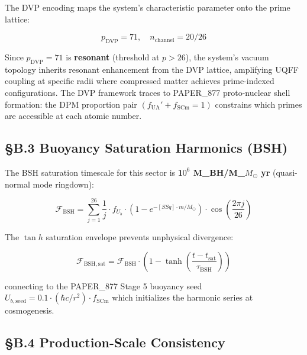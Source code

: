 \documentclass[12pt,a4paper]{article}
\begin{document}
The DVP encoding maps the system's characteristic parameter onto the prime lattice:

\begin{equation}
p_{\mathrm{DVP}} = 71, \quad n_{\mathrm{channel}} = 20/26
\end{equation}

Since $p_{\mathrm{DVP}} = 71$ is \textbf{resonant} (threshold at $p > 26$), the system's vacuum topology inherits resonant enhancement from the DVP lattice, amplifying UQFF coupling at specific radii where compressed matter achieves prime-indexed configurations. The DVP framework traces to PAPER\_877 proto-nuclear shell formation: the DPM proportion pair $(f_{\mathrm{UA}}' + f_{\mathrm{SCm}} = 1)$ constrains which primes are accessible at each atomic number.

\subsection{\S{}B.3 Buoyancy Saturation Harmonics (BSH)}

The BSH saturation timescale for this sector is \textbf{1$0^{6}$ M\_BH/M\_{$M_{\odot}$} yr} (quasi-normal mode ringdown):

\begin{equation}
\mathcal{F}_{\mathrm{BSH}} = \sum_{j=1}^{26} \frac{1}{j} \cdot f_U_b \cdot \left(1 - e^{-[SSq] \cdot m/M_\odot}\right) \cdot \cos\!\left(\frac{2\pi j}{26}\right)
\end{equation}

The $\tan h$ saturation envelope prevents unphysical divergence:

\begin{equation}
\mathcal{F}_{\mathrm{BSH,sat}} = \mathcal{F}_{\mathrm{BSH}} \cdot \left(1 - \tanh\!\left(\frac{t - t_{\mathrm{sat}}}{\tau_{\mathrm{BSH}}}\right)\right)
\end{equation}

connecting to the PAPER\_877 Stage 5 buoyancy seed $U_{b,\mathrm{seed}} = 0.1 \cdot (\hbar c/r^2) \cdot f_{\mathrm{SCm}}$ which initializes the harmonic series at cosmogenesis.

\subsection{\S{}B.4 Production-Scale Consistency}
\end{document}
